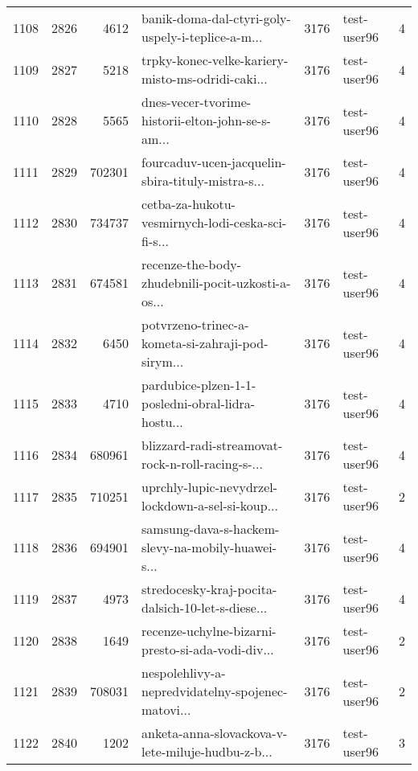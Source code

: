 \begin{tabular}{lrrlrlr}
1108 &       2826 &     4612 &  banik-doma-dal-ctyri-goly-uspely-i-teplice-a-m... &     3176 &                  test-user96 &               4 \\
1109 &       2827 &     5218 &  trpky-konec-velke-kariery-misto-ms-odridi-caki... &     3176 &                  test-user96 &               4 \\
1110 &       2828 &     5565 &  dnes-vecer-tvorime-historii-elton-john-se-s-am... &     3176 &                  test-user96 &               4 \\
1111 &       2829 &   702301 &  fourcaduv-ucen-jacquelin-sbira-tituly-mistra-s... &     3176 &                  test-user96 &               4 \\
1112 &       2830 &   734737 &  cetba-za-hukotu-vesmirnych-lodi-ceska-sci-fi-s... &     3176 &                  test-user96 &               4 \\
1113 &       2831 &   674581 &  recenze-the-body-zhudebnili-pocit-uzkosti-a-os... &     3176 &                  test-user96 &               4 \\
1114 &       2832 &     6450 &  potvrzeno-trinec-a-kometa-si-zahraji-pod-sirym... &     3176 &                  test-user96 &               4 \\
1115 &       2833 &     4710 &  pardubice-plzen-1-1-posledni-obral-lidra-hostu... &     3176 &                  test-user96 &               4 \\
1116 &       2834 &   680961 &  blizzard-radi-streamovat-rock-n-roll-racing-s-... &     3176 &                  test-user96 &               4 \\
1117 &       2835 &   710251 &  uprchly-lupic-nevydrzel-lockdown-a-sel-si-koup... &     3176 &                  test-user96 &               2 \\
1118 &       2836 &   694901 &  samsung-dava-s-hackem-slevy-na-mobily-huawei-s... &     3176 &                  test-user96 &               4 \\
1119 &       2837 &     4973 &  stredocesky-kraj-pocita-dalsich-10-let-s-diese... &     3176 &                  test-user96 &               4 \\
1120 &       2838 &     1649 &  recenze-uchylne-bizarni-presto-si-ada-vodi-div... &     3176 &                  test-user96 &               2 \\
1121 &       2839 &   708031 &  nespolehlivy-a-nepredvidatelny-spojenec-matovi... &     3176 &                  test-user96 &               2 \\
1122 &       2840 &     1202 &  anketa-anna-slovackova-v-lete-miluje-hudbu-z-b... &     3176 &                  test-user96 &               3 \\

\end{tabular}
